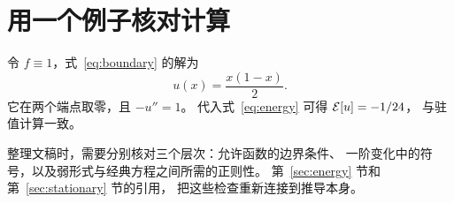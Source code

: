 \section{用一个例子核对计算}
\label{sec:review}
令 $f\equiv 1$，式~\eqref{eq:boundary} 的解为
\[
  u(x)=\frac{x(1-x)}{2}.
\]
它在两个端点取零，且 $-u''=1$。
代入式~\eqref{eq:energy} 可得 $\mathcal{E}[u]=-1/24$，
与驻值计算一致。

整理文稿时，需要分别核对三个层次：允许函数的边界条件、
一阶变化中的符号，以及弱形式与经典方程之间所需的正则性。
第~\ref{sec:energy} 节和第~\ref{sec:stationary} 节的引用，
把这些检查重新连接到推导本身。
